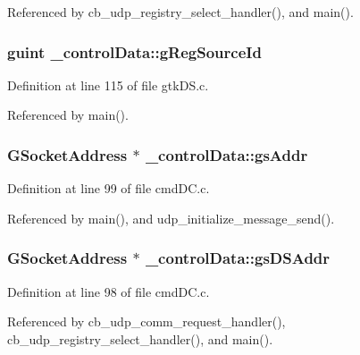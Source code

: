 Referenced by cb\+\_\+udp\+\_\+registry\+\_\+select\+\_\+handler(), and main().

\hypertarget{struct__control_data_a96ccde7cdcba6f4f52f472f95ddaf782}{}
\subsubsection[{g\+Reg\+Source\+Id}]{\setlength{\rightskip}{0pt plus 5cm}guint \+\_\+control\+Data\+::g\+Reg\+Source\+Id}\label{struct__control_data_a96ccde7cdcba6f4f52f472f95ddaf782}


Definition at line 115 of file gtk\+D\+S.\+c.



Referenced by main().

\hypertarget{struct__control_data_a8a43853386551af4c746fd4b882eb2bf}{}
\subsubsection[{gs\+Addr}]{\setlength{\rightskip}{0pt plus 5cm}G\+Socket\+Address $\ast$ \+\_\+control\+Data\+::gs\+Addr}\label{struct__control_data_a8a43853386551af4c746fd4b882eb2bf}


Definition at line 99 of file cmd\+D\+C.\+c.



Referenced by main(), and udp\+\_\+initialize\+\_\+message\+\_\+send().

\hypertarget{struct__control_data_a11c618822b208569a5d28206407326d5}{}
\subsubsection[{gs\+D\+S\+Addr}]{\setlength{\rightskip}{0pt plus 5cm}G\+Socket\+Address $\ast$ \+\_\+control\+Data\+::gs\+D\+S\+Addr}\label{struct__control_data_a11c618822b208569a5d28206407326d5}


Definition at line 98 of file cmd\+D\+C.\+c.



Referenced by cb\+\_\+udp\+\_\+comm\+\_\+request\+\_\+handler(), cb\+\_\+udp\+\_\+registry\+\_\+select\+\_\+handler(), and main().

